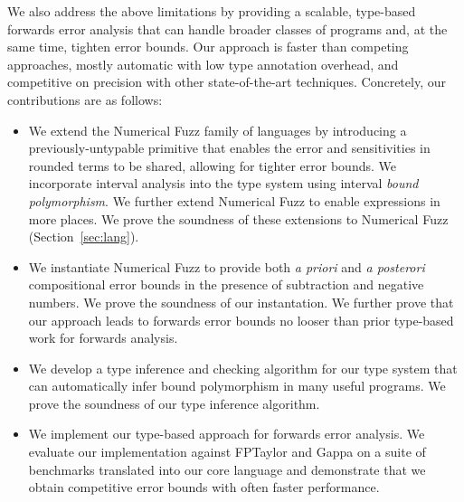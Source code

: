 We also address the above limitations by providing a scalable, type-based
forwards error analysis that can handle broader classes of programs and, at the
same time, tighten error bounds. Our approach is faster than competing
approaches, mostly automatic with low type annotation overhead, and competitive
on precision with other state-of-the-art techniques. Concretely, our
contributions are as follows:
\begin{itemize}
  \item We extend the Numerical Fuzz family of languages by introducing a
    previously-untypable primitive that enables the error and sensitivities in
    rounded terms to be shared, allowing for tighter error bounds. We
    incorporate interval analysis into the type system using interval
    \textit{bound polymorphism}. We further extend Numerical Fuzz to enable
    expressions in more places. We prove the soundness of these extensions to
    Numerical Fuzz (Section~\ref{sec:lang}).

  \item We instantiate Numerical Fuzz to provide both \textit{a priori} and \textit{a
    posterori} compositional error bounds in the presence of subtraction and
    negative numbers. 
    We prove the soundness of our instantation. We further prove that our
    approach leads to forwards error bounds no looser than prior type-based work
    for forwards analysis. 

  \item We develop a type inference and checking algorithm for our type system
    that can automatically infer bound polymorphism in many useful programs. We
    prove the soundness of our type inference algorithm.

  \item We implement our type-based approach for forwards error analysis. We
    evaluate our implementation against FPTaylor and Gappa on a suite of
    benchmarks translated into our core language and demonstrate that we obtain
    competitive error bounds with often faster performance.
\end{itemize}
